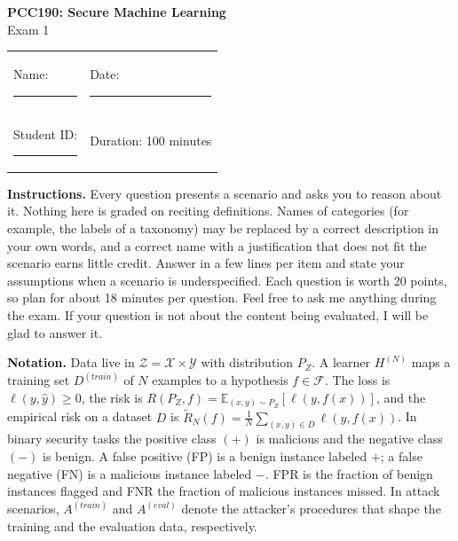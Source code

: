 \documentclass[10pt,a4paper]{extarticle}
\newif\ifkey
\begin{document}
\begin{center}
  {\Large\bfseries\color{navy} PCC190: Secure Machine Learning}\\[2pt]
  {\large Exam 1}\\[2pt]
  \ifkey {\large\bfseries\color{accent} Answer key and grading notes} \fi
\end{center}

\vspace{2pt}
\begin{tabular}{@{}p{}p{}@{}}
Name: \rule{0.32\textwidth}{0.4pt} & Date: \rule{0.25\textwidth}{0.4pt}\\[4pt]
Student ID: \rule{0.27\textwidth}{0.4pt} & Duration: 100 minutes\\
\end{tabular}

\begin{tcolorbox}[colback=navy!4, colframe=navy!60, boxrule=0.4pt, arc=1pt, left=5pt, right=5pt, top=3pt, bottom=3pt]
\textbf{Instructions.} Every question presents a scenario and asks you to reason about it. Nothing here is graded on reciting definitions. Names of categories (for example, the labels of a taxonomy) may be replaced by a correct description in your own words, and a correct name with a justification that does not fit the scenario earns little credit. Answer in a few lines per item and state your assumptions when a scenario is underspecified. Each question is worth 20 points, so plan for about 18 minutes per question. Feel free to ask me anything during the exam. If your question is not about the content being evaluated, I will be glad to answer it.

\smallskip
\textbf{Notation.} Data live in \(\mathcal Z=\mathcal X\times\mathcal Y\) with distribution \(P_Z\). A learner \(H^{(N)}\) maps a training set \(D^{(train)}\) of \(N\) examples to a hypothesis \(f\in\mathcal F\). The loss is \(\ell(y,\hat y)\ge 0\), the risk is \(R(P_Z,f)=\mathbb E_{(x,y)\sim P_Z}[\ell(y,f(x))]\), and the empirical risk on a dataset \(D\) is \(\tilde R_N(f)=\frac1N\sum_{(x,y)\in D}\ell(y,f(x))\). In binary security tasks the positive class \((+)\) is malicious and the negative class \((-)\) is benign. A false positive (FP) is a benign instance labeled \(+\); a false negative (FN) is a malicious instance labeled \(-\). FPR is the fraction of benign instances flagged and FNR the fraction of malicious instances missed. In attack scenarios, \(A^{(train)}\) and \(A^{(eval)}\) denote the attacker's procedures that shape the training and the evaluation data, respectively.
\end{tcolorbox}
\end{document}
